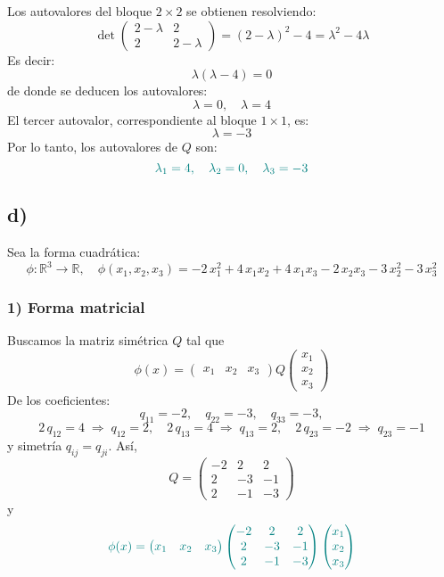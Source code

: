 \documentclass{article}
\begin{document}
Los autovalores del bloque \(2\times2\) se obtienen resolviendo:
\[
\det\begin{pmatrix}
2-\lambda & 2\\
2 & 2-\lambda
\end{pmatrix}
= (2-\lambda)^2 - 4 = \lambda^2 - 4\lambda
\]
Es decir:
\[
\lambda(\lambda - 4) = 0
\]
de donde se deducen los autovalores:
\[
\lambda = 0,
\quad
\lambda = 4
\]
El tercer autovalor, correspondiente al bloque \(1\times1\), es:
\[
\lambda = -3
\]
Por lo tanto, los autovalores de \(Q\) son:
\[
\color{teal}
\lambda_1 = 4,
\quad
\lambda_2 = 0,
\quad
\lambda_3 = -3
\]

\subsection*{d)}
Sea la forma cuadrática:
\[
\phi:\mathbb{R}^3\to\mathbb{R},
\quad
\phi(x_1,x_2,x_3)=-2\,x_1^2+4\,x_1x_2+4\,x_1x_3-2\,x_2x_3-3\,x_2^2-3\,x_3^2
\]

\subsubsection*{1) Forma matricial}

Buscamos la matriz simétrica \(Q\) tal que
\[
\phi(x)=
\begin{pmatrix}x_1 & x_2 & x_3\end{pmatrix}
Q
\begin{pmatrix}x_1\\x_2\\x_3\end{pmatrix}
\]
De los coeficientes:
\[
q_{11}=-2,\quad
q_{22}=-3,\quad
q_{33}=-3,
\]
\[
2\,q_{12}=4\;\Longrightarrow\;q_{12}=2,
\quad
2\,q_{13}=4\;\Longrightarrow\;q_{13}=2,
\quad
2\,q_{23}=-2\;\Longrightarrow\;q_{23}=-1
\]
y simetría \(q_{ij}=q_{ji}\). Así,
\[
Q=
\begin{pmatrix}
-2 & 2 & 2\\[4pt]
2  & -3& -1\\[4pt]
2  & -1& -3
\end{pmatrix}
\]
y
\[
\color{teal}
\phi(x)=
\begin{pmatrix}x_1 & x_2 & x_3\end{pmatrix}
\begin{pmatrix}
-2 & 2 & 2\\
2  & -3& -1\\
2  & -1& -3
\end{pmatrix}
\begin{pmatrix}x_1\\x_2\\x_3\end{pmatrix}
\]
\end{document}
